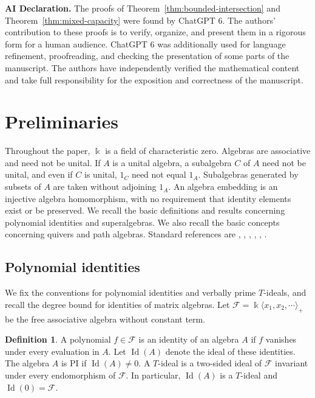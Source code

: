 \documentclass[11pt,reqno]{amsart}
\newcommand{\kk}{\Bbbk}
\newcommand{\F}{\mathcal F}
\newcommand{\Id}{\operatorname{Id}}
\theoremstyle{definition}
\newtheorem{definition}[theorem]{Definition}
\theoremstyle{remark}
\numberwithin{equation}{section}
\begin{document}
\medskip
\noindent\textbf{AI Declaration.}
The proofs of Theorem~\ref{thm:bounded-intersection} and
Theorem~\ref{thm:mixed-capacity} were found by ChatGPT 6.
The authors' contribution to these proofs is to verify, organize,
and present them in a rigorous form for a human audience.
ChatGPT 6 was additionally used for language refinement,
proofreading, and checking the presentation of some parts of
the manuscript.
The authors have independently verified the mathematical content
and take full responsibility for the exposition and correctness
of the manuscript.




\section{Preliminaries}\label{sec:preliminaries}

Throughout the paper, $\kk$ is a field of characteristic zero. Algebras are associative and need not  be unital.  If  \(A\) is a unital algebra, a subalgebra $C$ of $A$ need not be unital, and even if \(C\) is unital,   \(1_C\) need not equal \(1_A\). Subalgebras generated by subsets of \(A\) are taken without adjoining \(1_A\). An algebra embedding is an injective algebra homomorphism, with no requirement that identity elements exist or be preserved. 
We recall the basic definitions and results concerning
polynomial identities and superalgebras. We also recall the basic concepts concerning quivers and 
path algebras. Standard references are  
\cite{AssemSimsonSkowronski2006},  \cite{BangJensenGutin2009},  \cite{Bresar2014},  
\cite{DerksenWeyman2017},  \cite{GiambrunoZaicev2005},  \cite{Kemer1991}.

\subsection{Polynomial identities}\label{subsec:polynomial-identities}

We fix the conventions for polynomial identities and verbally prime
$T$-ideals, and recall the degree bound for identities of matrix algebras.
Let $\F=\kk\langle x_1,x_2,\cdots\rangle_+$ be the free
associative algebra without constant term.

\begin{definition}\label{def:polynomial-identities}
A polynomial $f\in\F$ is an identity of an algebra $A$ if
$f$ vanishes under every evaluation in $A$.
Let $\Id(A)$ denote the ideal of these identities.
The algebra $A$ is PI if $\Id(A)\ne0$.
A $T$-ideal is a two-sided ideal of $\F$ invariant under every
endomorphism of $\F$. In particular, $\Id(A)$ is a $T$-ideal
and $\Id(0)=\F$.
\end{definition}
\end{document}
